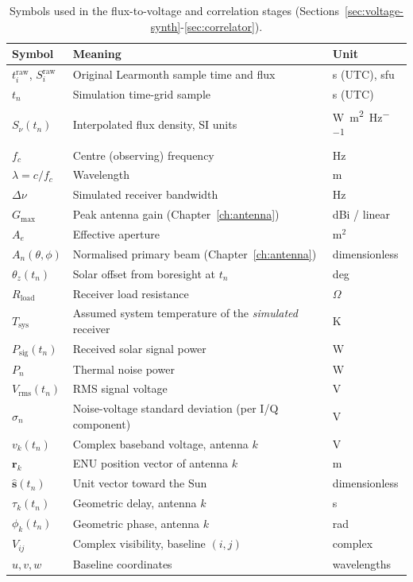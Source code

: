 \begin{table}[H]
  \centering
  \caption[Symbols used in the flux-to-voltage and correlation stages]{Symbols used in the flux-to-voltage and correlation stages (Sections~\ref{sec:voltage-synth}-\ref{sec:correlator}).}
  \label{tab:params}
  \renewcommand{\arraystretch}{1.25}
  \begin{tabularx}{\textwidth}{l >{\raggedright\arraybackslash}X l}
    \toprule
    \textbf{Symbol} & \textbf{Meaning} & \textbf{Unit} \\
    \midrule
    $t_i^\mathrm{raw}$, $S_i^\mathrm{raw}$ & Original Learmonth sample time and flux & s (UTC), sfu \\
    $t_n$ & Simulation time-grid sample & s (UTC) \\
    $S_\nu(t_n)$ & Interpolated flux density, SI units & \si{\watt\per\square\metre\per\hertz} \\
    $f_c$ & Centre (observing) frequency & Hz \\
    $\lambda=c/f_c$ & Wavelength & m \\
    $\Delta\nu$ & Simulated receiver bandwidth & Hz \\
    $G_\mathrm{max}$ & Peak antenna gain (Chapter~\ref{ch:antenna}) & dBi / linear \\
    $A_e$ & Effective aperture & m$^2$ \\
    $A_n(\theta,\phi)$ & Normalised primary beam (Chapter~\ref{ch:antenna}) & dimensionless \\
    $\theta_z(t_n)$ & Solar offset from boresight at $t_n$ & deg \\
    $R_\mathrm{load}$ & Receiver load resistance & $\Omega$ \\
    $T_\mathrm{sys}$ & Assumed system temperature of the \emph{simulated} receiver & K \\
    $P_\mathrm{sig}(t_n)$ & Received solar signal power & W \\
    $P_n$ & Thermal noise power & W \\
    $V_\mathrm{rms}(t_n)$ & RMS signal voltage & V \\
    $\sigma_n$ & Noise-voltage standard deviation (per I/Q component) & V \\
    $v_k(t_n)$ & Complex baseband voltage, antenna $k$ & V \\
    $\bm{r}_k$ & ENU position vector of antenna $k$ & m \\
    $\hat{\bm{s}}(t_n)$ & Unit vector toward the Sun & dimensionless \\
    $\tau_k(t_n)$ & Geometric delay, antenna $k$ & s \\
    $\phi_k(t_n)$ & Geometric phase, antenna $k$ & rad \\
    $V_{ij}$ & Complex visibility, baseline $(i,j)$ & complex \\
    $u,v,w$ & Baseline coordinates & wavelengths \\
    \bottomrule
  \end{tabularx}
\end{table}

